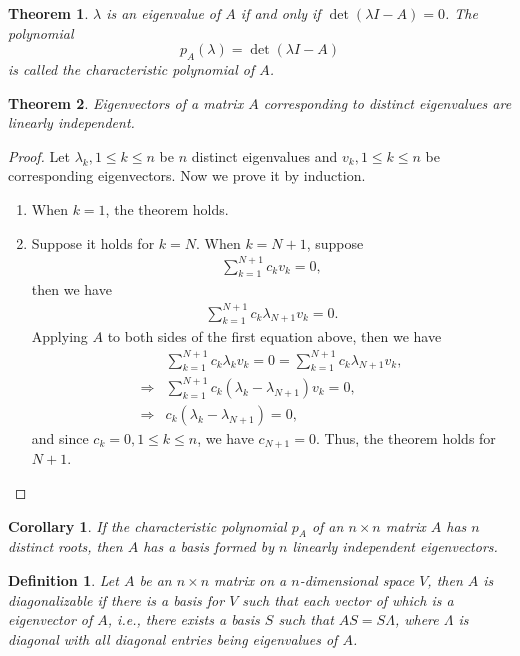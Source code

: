 \documentclass[10pt]{book}
\newtheorem{definition}{Definition}[chapter]
\newtheorem{theorem}{Theorem}[chapter]
\newtheorem{corollary}{Corollary}[theorem]
\theoremstyle{definition}
\numberwithin{equation}{chapter}
\begin{document}
\medskip

\begin{theorem}
$\lambda$ is an eigenvalue of $A$ if and only if $\det (\lambda I-A) = 0$. The polynomial
$$p_A(\lambda) = \det (\lambda I-A)$$
is called the characteristic polynomial of $A$.
\end{theorem}

\medskip

\begin{theorem}
Eigenvectors of a matrix $A$ corresponding to distinct eigenvalues
are linearly independent.
\end{theorem}
\begin{proof}
Let $\lambda_k, 1\leq k \leq n$ be $n$ distinct eigenvalues and $v_k, 1\leq k \leq n$ be corresponding eigenvectors. Now we prove it by induction.
\begin{enumerate}[label=(\alph*)]
    \item When $k = 1$, the theorem holds.
    \item Suppose it holds for $k = N$. When $k = N+1$, suppose 
    \begin{align*}
        \sum^{N+1}_{k=1}c_k v_k = 0,
    \end{align*}
    then we have
    \begin{align*}
        \sum^{N+1}_{k=1}c_k \lambda_{N+1} v_k = 0.
    \end{align*}
    Applying $A$ to both sides of the first equation above, then we have
    \begin{align*}
        & \sum^{N+1}_{k=1}c_k \lambda_k v_k = 0 = \sum^{N+1}_{k=1}c_k \lambda_{N+1} v_k, \\
        \Rightarrow & \sum^{N+1}_{k=1}c_k (\lambda_k  - \lambda_{N+1}) v_k = 0, \\
        \Rightarrow & c_k (\lambda_k  - \lambda_{N+1}) = 0,
    \end{align*}
    and since $c_k = 0, 1\leq k\leq n$, we have $c_{N+1} = 0$. Thus, the theorem holds for $N+1$. 
\end{enumerate}
\end{proof}

\medskip

\begin{corollary}
If the characteristic polynomial $p_A$ of an $n\times n$ matrix $A$ has $n$ distinct roots, then $A$ has a basis formed by $n$ linearly independent eigenvectors.
\end{corollary}

\medskip

\begin{definition}{\rm \cite{27}}
Let $A$ be an $n \times n$ matrix on a $n$-dimensional space $V$, then $A$ is diagonalizable if there is a basis for $V$ such that each vector of which is a eigenvector of $A$, i.e., there exists a basis $S$ such that $AS = S\Lambda$, where $\Lambda$ is diagonal with all diagonal entries being eigenvalues of $A$.
\end{definition}
\end{document}
